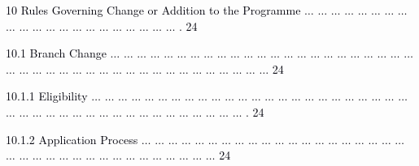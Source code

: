 \documentclass[12pt]{article}
\begin{document}
\vspace{\baselineskip}
{\fontsize{7pt}{8.4pt}\selectfont \textcolor[HTML]{00000A}{10 Rules Governing Change or Addition to the Programme $ \ldots $ $ \ldots $ $ \ldots $ $ \ldots $ $ \ldots $ $ \ldots $ $ \ldots $ $ \ldots $ $ \ldots $ $ \ldots $ $ \ldots $ $ \ldots $ $ \ldots $ $ \ldots $ $ \ldots $ $ \ldots $ $ \ldots $ $ \ldots $ $ \ldots $ $ \ldots $ $ \ldots $ . 24}\par}\par


\vspace{\baselineskip}
\begin{adjustwidth}{0.21in}{0.0in}
{\fontsize{7pt}{8.4pt}\selectfont \textcolor[HTML]{00000A}{10.1 Branch Change $ \ldots $ $ \ldots $ $ \ldots $ $ \ldots $ $ \ldots $ $ \ldots $ $ \ldots $ $ \ldots $ $ \ldots $ $ \ldots $ $ \ldots $ $ \ldots $ $ \ldots $ $ \ldots $ $ \ldots $ $ \ldots $ $ \ldots $ $ \ldots $ $ \ldots $ $ \ldots $ $ \ldots $ $ \ldots $ $ \ldots $ $ \ldots $ $ \ldots $ $ \ldots $ $ \ldots $ $ \ldots $ $ \ldots $ $ \ldots $ $ \ldots $ $ \ldots $ $ \ldots $ $ \ldots $ $ \ldots $ $ \ldots $ $ \ldots $ $ \ldots $ $ \ldots $ $ \ldots $ $ \ldots $ $ \ldots $ $ \ldots $  24}\par}\par

\end{adjustwidth}


\vspace{\baselineskip}
\begin{adjustwidth}{0.5in}{0.0in}
{\fontsize{7pt}{8.4pt}\selectfont \textcolor[HTML]{00000A}{10.1.1 Eligibility $ \ldots $ $ \ldots $ $ \ldots $ $ \ldots $ $ \ldots $ $ \ldots $ $ \ldots $ $ \ldots $ $ \ldots $ $ \ldots $ $ \ldots $ $ \ldots $ $ \ldots $ $ \ldots $ $ \ldots $ $ \ldots $ $ \ldots $ $ \ldots $ $ \ldots $ $ \ldots $ $ \ldots $ $ \ldots $ $ \ldots $ $ \ldots $ $ \ldots $ $ \ldots $ $ \ldots $ $ \ldots $ $ \ldots $ $ \ldots $ $ \ldots $ $ \ldots $ $ \ldots $ $ \ldots $ $ \ldots $ $ \ldots $ $ \ldots $ $ \ldots $ $ \ldots $ $ \ldots $ $ \ldots $ $ \ldots $ . 24}\par}\par

\end{adjustwidth}


\vspace{\baselineskip}
\begin{adjustwidth}{0.5in}{0.0in}
{\fontsize{7pt}{8.4pt}\selectfont \textcolor[HTML]{00000A}{10.1.2 Application Process $ \ldots $ $ \ldots $ $ \ldots $ $ \ldots $ $ \ldots $ $ \ldots $ $ \ldots $ $ \ldots $ $ \ldots $ $ \ldots $ $ \ldots $ $ \ldots $ $ \ldots $ $ \ldots $ $ \ldots $ $ \ldots $ $ \ldots $ $ \ldots $ $ \ldots $ $ \ldots $ $ \ldots $ $ \ldots $ $ \ldots $ $ \ldots $ $ \ldots $ $ \ldots $ $ \ldots $ $ \ldots $ $ \ldots $ $ \ldots $ $ \ldots $ $ \ldots $ $ \ldots $ $ \ldots $ $ \ldots $ $ \ldots $  24}\par}\par

\end{adjustwidth}
\end{document}
